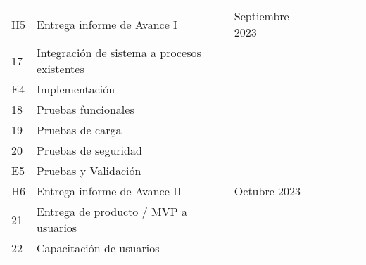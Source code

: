 \begin{longtable}[c]{@{}llllllll@{}}
	H5                                     & Entrega informe de Avance I                     & \multicolumn{2}{l}{Septiembre 2023}   &                                          &               &                &                                    \\
	17                                     & Integración de sistema a procesos existentes    &                                       &                                          &               &                &                  &                 \\
	E4                                     & Implementación                                  &                                       &                                          &               &                &                  &                 \\
	18                                     & Pruebas funcionales                             &                                       &                                          &               &                &                  &                 \\
	19                                     & Pruebas de carga                                &                                       &                                          &               &                &                  &                 \\
	20                                     & Pruebas de seguridad                            &                                       &                                          &               &                &                  &                 \\
	E5                                     & Pruebas y Validación                            &                                       &                                          &               &                &                  &                 \\
	H6                                     & Entrega informe de Avance II                    & \multicolumn{2}{l}{Octubre 2023}      &                                          &               &                &                                    \\
	21                                     & Entrega de producto / MVP a usuarios            &                                       &                                          &               &                &                  &                 \\
	22                                     & Capacitación de usuarios                        &                                       &                                          &               &                &                  &                 \\

\end{longtable}
